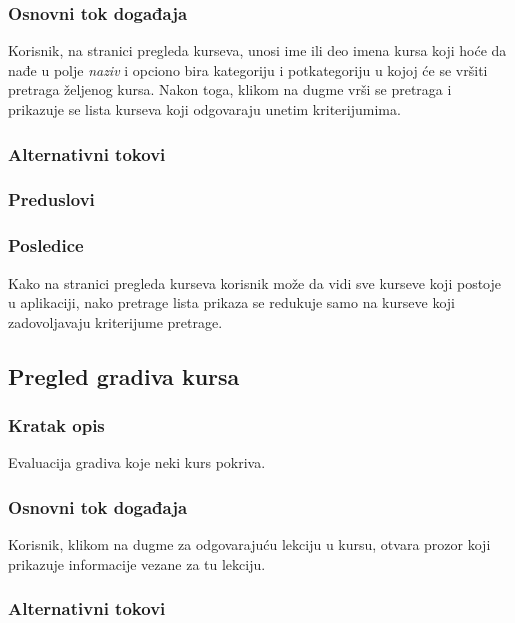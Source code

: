 \subsubsection{Osnovni tok događaja}
Korisnik, na stranici pregleda kurseva, unosi ime ili deo imena kursa koji hoće da nađe u polje \emph{naziv} i opciono bira kategoriju i potkategoriju u kojoj će se vršiti pretraga željenog kursa.
Nakon toga, klikom na dugme \SearchButton vrši se pretraga i prikazuje se lista kurseva koji odgovaraju unetim kriterijumima.

\subsubsection{Alternativni tokovi}

\subsubsection{Preduslovi}

\subsubsection{Posledice}
Kako na stranici pregleda kurseva korisnik može da vidi sve kurseve koji postoje u aplikaciji, nako pretrage lista prikaza se redukuje samo na kurseve koji zadovoljavaju kriterijume pretrage.


\subsection{Pregled gradiva kursa}
\label{subsec:pregled-gradiva-kursa}

\subsubsection{Kratak opis}
Evaluacija gradiva koje neki kurs pokriva.

\subsubsection{Osnovni tok događaja}
Korisnik, klikom na dugme  za odgovarajuću lekciju u kursu, otvara prozor koji prikazuje informacije vezane za tu lekciju.

\subsubsection{Alternativni tokovi}

